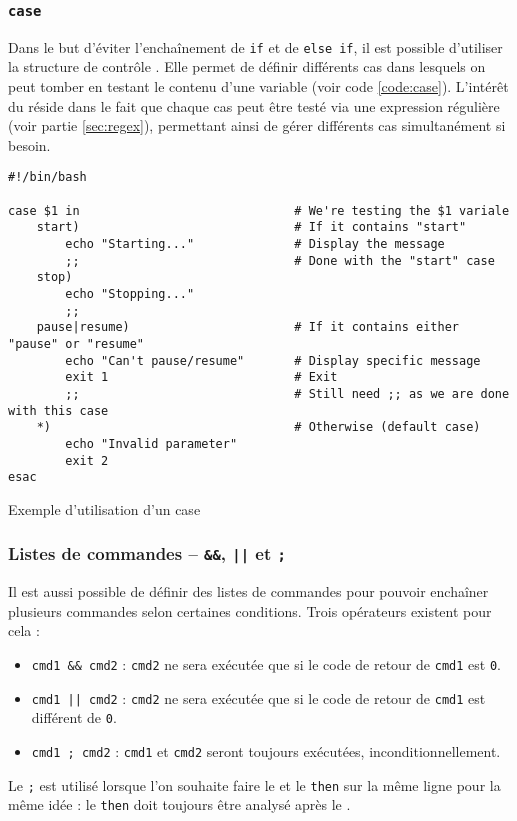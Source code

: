 \subsubsection{\texttt{case}} 
Dans le but d'éviter l'enchaînement de \texttt{if} et de \texttt{else if}, il est possible d'utiliser la structure de contrôle . Elle permet de définir différents cas dans lesquels on peut tomber en testant le contenu d'une variable (voir code \ref{code:case}). L'intérêt du  réside dans le fait que chaque cas peut être testé via une expression régulière (voir partie \ref{sec:regex}), permettant ainsi de gérer différents cas simultanément si besoin.

\begin{code}
    \centering
    \begin{verbatim}
#!/bin/bash

case $1 in                              # We're testing the $1 variale
    start)                              # If it contains "start"
        echo "Starting..."              # Display the message
        ;;                              # Done with the "start" case
    stop)
        echo "Stopping..."
        ;;
    pause|resume)                       # If it contains either "pause" or "resume"
        echo "Can't pause/resume"       # Display specific message
        exit 1                          # Exit
        ;;                              # Still need ;; as we are done with this case
    *)                                  # Otherwise (default case)
        echo "Invalid parameter"
        exit 2
esac
\end{verbatim}
\vspace{-\baselineskip}
    \caption{Exemple d'utilisation d'un case}
    \label{code:case}
\end{code}

\subsubsection{Listes de commandes -- \texttt{\&\&}, \texttt{||} et \texttt{;}}

Il est aussi possible de définir des listes de commandes pour pouvoir enchaîner plusieurs commandes selon certaines conditions. Trois opérateurs existent pour cela :
\begin{itemize}
    \item \texttt{cmd1 && cmd2} : \texttt{cmd2} ne sera exécutée que si le code de retour de \texttt{cmd1} est \texttt{0}.
    \item \texttt{cmd1 || cmd2} : \texttt{cmd2} ne sera exécutée que si le code de retour de \texttt{cmd1} est différent de \texttt{0}.
    \item \texttt{cmd1 ; cmd2} : \texttt{cmd1} et \texttt{cmd2} seront toujours exécutées, inconditionnellement.
\end{itemize}
 Le \texttt{;} est utilisé lorsque l'on souhaite faire le  et le \texttt{then} sur la même ligne pour la même idée : le \texttt{then} doit toujours être analysé après le .

